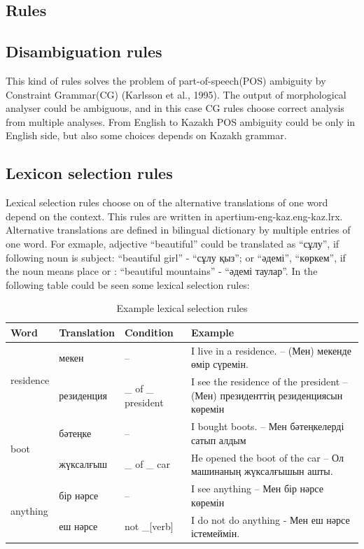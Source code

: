 \documentclass[11pt]{article}
\begin{document}
\subsection{Rules}

\subsection{Disambiguation rules}

This kind of rules solves the problem of part-of-speech(POS) ambiguity by Constraint Grammar(CG) (Karlsson et al., 1995). The output of morphological analyser could be ambiguous, and in this case CG rules choose correct analysis from multiple analyses. From English to Kazakh POS ambiguity could be only in English side, but also some choices depends on Kazakh grammar.

\subsection{Lexicon selection rules }

Lexical selection rules choose on of the alternative translations of one word depend on the context. This rules are written in apertium-eng-kaz.eng-kaz.lrx. Alternative translations are defined in bilingual dictionary by multiple entries of one word. For exmaple, adjective “beautiful” could be translated as “сұлу”, if following noun is subject: “beautiful girl” - “сұлу қыз”; or “әдемі”, “көркем”, if the noun means place or : “beautiful mountains” - “әдемі таулар”.  In the following table could be seen some lexical selection rules:

\begin{table}
 \centering
 \begin{tabular}{|l|l|l|l|}
    \hline
    \textbf{Word} & \textbf{Translation} & \textbf{Condition} & \textbf{Example} \\
    \hline
    \multirow{2}{*}{residence} & мекен & -- & I live in a residence. -- (Мен) мекенде өмір сүремін. \\
                               & резиденция & \_ of \_ president & I see the residence of the president -- (Мен) президенттің резиденциясын көремін \\
    \hline
    \multirow{2}{*}{boot} & бәтеңке & -- & I bought boots. -- Мен бәтеңкелерді сатып алдым \\
                          & жүксалғыш & \_ of \_ car &  He opened the boot of the car  -- Ол машинаның жүксалғышын ашты. \\
    \hline
    \multirow{2}{*}{anything} & бір нәрсе & -- & I  see anything -- Мен бір нәрсе көремін \\
                              & еш нәрсе & not \_[verb] & I do not do anything - Мен еш нәрсе істемеймін. \\

    \hline
 \end{tabular}
  \caption{Example lexical selection rules}
\end{table}
\end{document}

